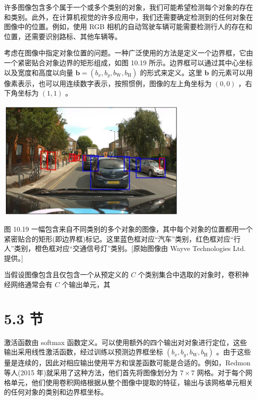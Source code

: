 \documentclass[10pt]{article}
\begin{document}
许多图像包含多个属于一个或多个类别的对象，我们可能希望检测每个对象的存在和类别。此外，在计算机视觉的许多应用中，我们还需要确定检测到的任何对象在图像中的位置。例如，使用 RGB 相机的自动驾驶车辆可能需要检测行人的存在和位置，还需要识别路标、其他车辆等。

考虑在图像中指定对象位置的问题。一种广泛使用的方法是定义一个边界框，它由一个紧密贴合对象边界的矩形组成，如图 10.19 所示。边界框可以通过其中心坐标以及宽度和高度以向量 \(\mathbf{b} = \left( {{b}_{x},{b}_{y},{b}_{\mathrm{W}},{b}_{\mathrm{H}}}\right)\) 的形式来定义。这里 \(\mathbf{b}\) 的元素可以用像素表示，也可以用连续数字表示，按照惯例，图像的左上角坐标为 \(\left( {0,0}\right)\) ，右下角坐标为 \(\left( {1,1}\right)\) 。

\begin{center}
\includegraphics[max width=0.7\textwidth]{images/0194e279-9b28-703a-88f4-c3ac21e2010d_329_590_347_890_562_0.jpg}
\end{center}
\hspace*{3em} 

图 10.19 一幅包含来自不同类别的多个对象的图像，其中每个对象的位置都用一个紧密贴合的矩形(即边界框)标记。这里蓝色框对应“汽车”类别，红色框对应“行人”类别，橙色框对应“交通信号灯”类别。[原始图像由 Wayve Technologies Ltd. 提供。]

当假设图像包含且仅包含一个从预定义的 \(C\) 个类别集合中选取的对象时，卷积神经网络通常会有 \(C\) 个输出单元，其

\section*{5.3 节}

激活函数由 softmax 函数定义。可以使用额外的四个输出对对象进行定位，这些输出采用线性激活函数，经过训练以预测边界框坐标 \(\left( {{b}_{x},{b}_{y},{b}_{\mathrm{W}},{b}_{\mathrm{H}}}\right)\) 。由于这些量是连续的，因此对相应输出使用平方和误差函数可能是合适的。例如，Redmon 等人(2015 年)就采用了这种方法，他们首先将图像划分为 \(7 \times  7\) 网格。对于每个网格单元，他们使用卷积网络根据从整个图像中提取的特征，输出与该网格单元相关的任何对象的类别和边界框坐标。
\end{document}
